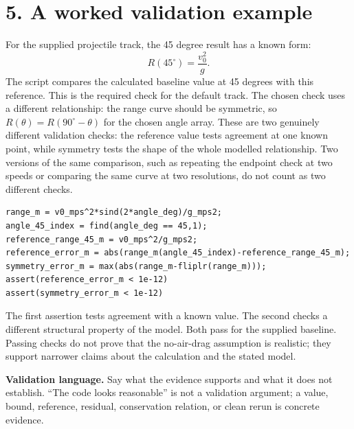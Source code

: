 \documentclass[11pt,a4paper]{article}
\begin{document}
\section*{5. A worked validation example}
For the supplied projectile track, the 45 degree result has a known form:
\[
R(45^\circ)=\frac{v_0^2}{g}.
\]
The script compares the calculated baseline value at 45 degrees with this reference. This is the required check for the default track. The chosen check uses a different relationship: the range curve should be symmetric, so $R(\theta)=R(90^\circ-\theta)$ for the chosen angle array. These are two genuinely different validation checks: the reference value tests agreement at one known point, while symmetry tests the shape of the whole modelled relationship. Two versions of the same comparison, such as repeating the endpoint check at two speeds or comparing the same curve at two resolutions, do not count as two different checks.
\begin{lstlisting}[style=matlabstyle,caption={MATLAB code for the projectile baseline output and two genuinely different validation checks}]
range_m = v0_mps^2*sind(2*angle_deg)/g_mps2;
angle_45_index = find(angle_deg == 45,1);
reference_range_45_m = v0_mps^2/g_mps2;
reference_error_m = abs(range_m(angle_45_index)-reference_range_45_m);
symmetry_error_m = max(abs(range_m-fliplr(range_m)));
assert(reference_error_m < 1e-12)
assert(symmetry_error_m < 1e-12)
\end{lstlisting}
The first assertion tests agreement with a known value. The second checks a different structural property of the model. Both pass for the supplied baseline. Passing checks do not prove that the no-air-drag assumption is realistic; they support narrower claims about the calculation and the stated model.
\begin{checkbox}\textbf{Validation language.} Say what the evidence supports and what it does not establish. ``The code looks reasonable'' is not a validation argument; a value, bound, reference, residual, conservation relation, or clean rerun is concrete evidence.\end{checkbox}
\end{document}
